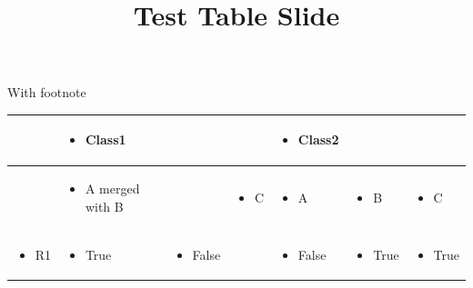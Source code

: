 \documentclass[11pt,a4paper]{article}
\title{Test Table Slide}
\begin{document}
\maketitle

With footnote

\begin{table}[h]
\begin{tabular}{|l|l|l|l|l|l|l|}
\hline
 & \begin{itemize} \item Class1 \end{itemize} &  &  & \begin{itemize} \item Class2 \end{itemize} &  &  \\ \hline
 & \begin{itemize} \item A merged with B \end{itemize} &  & \begin{itemize} \item C \end{itemize} & \begin{itemize} \item A \end{itemize} & \begin{itemize} \item B \end{itemize} & \begin{itemize} \item C \end{itemize} \\ \hline
\begin{itemize} \item R1 \end{itemize} & \begin{itemize} \item True \end{itemize} & \begin{itemize} \item False \end{itemize} &  & \begin{itemize} \item False \end{itemize} & \begin{itemize} \item True \end{itemize} & \begin{itemize} \item True \end{itemize} \\ \hline

\end{tabular}
\end{table}
\end{document}
